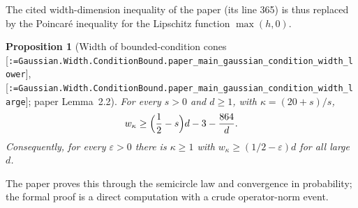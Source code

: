 \documentclass[11pt]{article}
\makeatletter
\newcommand{\formal@break}[1]{\@tfor\formal@tok:=#1\do{%
  \formal@tok
  \expandafter\ifx\formal@tok.\allowbreak\else
  \expandafter\ifx\formal@tok\_\allowbreak\fi\fi}}
\DeclareRobustCommand{\formal}[1]{\textnormal{[\texttt{\small\formal@break{#1}}]}}
\theoremstyle{plain}
\newtheorem{proposition}[theorem]{Proposition}
\theoremstyle{definition}
\makeatother
\begin{document}
The cited width-dimension inequality of the paper (its line 365) is thus
replaced by the Poincar\'e inequality for the Lipschitz function $\max(h,0)$.

\begin{proposition}[Width of bounded-condition cones \formal{Gaussian.Width.ConditionBound.paper\_main\_gaussian\_condition\_width\_lower}, \formal{Gaussian.Width.ConditionBound.paper\_main\_gaussian\_condition\_width\_large}; paper Lemma~2.2]\label{prop:conewidth}
For every $s > 0$ and $d \ge 1$, with $\kappa = (20 + s)/s$,
\[
w_\kappa \ge \Bigl(\frac12 - s\Bigr) d - 3 - \frac{864}{d} .
\]
Consequently, for every $\varepsilon > 0$ there is $\kappa \ge 1$ with
$w_\kappa \ge (1/2 - \varepsilon) d$ for all large $d$.
\end{proposition}

The paper proves this through the semicircle law and convergence in
probability; the formal proof is a direct computation with a crude
operator-norm event.
\end{document}
